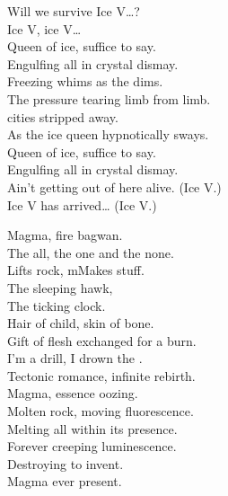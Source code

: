 Will we survive Ice V…? \\

Ice V, ice V… \\

Queen of ice, suffice to say. \\
Engulfing all in crystal dismay. \\
Freezing whims as the  dims. \\
The pressure tearing limb from limb. \\

 cities stripped away. \\
As the ice queen hypnotically sways. \\
Queen of ice, suffice to say. \\
Engulfing all in crystal dismay. \\

Ain't getting out of here alive. (Ice V.) \\
Ice V has arrived… (Ice V.) \\





Magma, fire bagwan. \\
The all, the one and the none. \\
Lifts rock, mMakes stuff. \\
The sleeping hawk, \\
The ticking clock. \\

Hair of child, skin of bone. \\
Gift of flesh exchanged for a burn. \\
I'm a drill, I drown the . \\
Tectonic romance, infinite rebirth. \\

Magma, essence oozing. \\
Molten rock, moving fluorescence. \\
Melting all within its presence. \\
Forever creeping luminescence. \\
Destroying to invent. \\
Magma  ever present. \\

